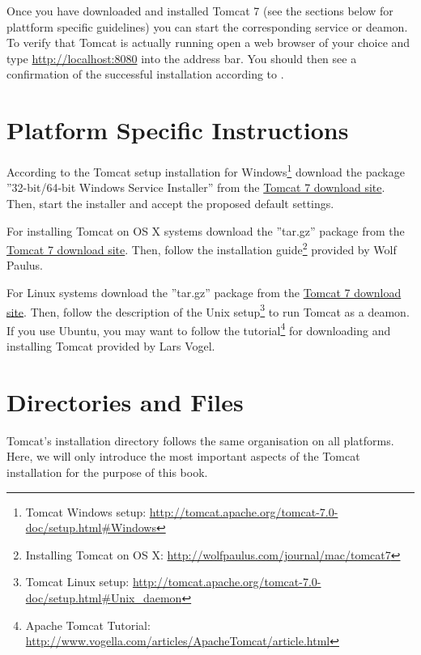 \documentclass[a4paper,10pt,twoside]{book}
\begin{document}
Once you have downloaded and installed Tomcat 7 (see the sections below for plattform specific guidelines) you can start the corresponding service or deamon.
To verify that Tomcat is actually running open a web browser of your choice and type \url{http://localhost:8080} into the address bar.
You should then see a confirmation of the successful installation according to .

\section{Platform Specific Instructions}

According to the Tomcat setup installation for Windows\footnote{
Tomcat Windows setup: \url{http://tomcat.apache.org/tomcat-7.0-doc/setup.html#Windows}
}
download the package ''32-bit/64-bit Windows Service Installer'' from the \href{http://tomcat.apache.org/download-70.cgi}{Tomcat 7 download site}.
Then, start the installer and accept the proposed default settings.

For installing Tomcat on OS X systems download the ''tar.gz'' package from the \href{http://tomcat.apache.org/download-70.cgi}{Tomcat 7 download site}.
Then, follow the installation guide\footnote{
Installing Tomcat on OS X: \url{http://wolfpaulus.com/journal/mac/tomcat7}
} provided by Wolf Paulus.

For Linux systems download the ''tar.gz'' package from the \href{http://tomcat.apache.org/download-70.cgi}{Tomcat 7 download site}.
Then, follow the description of the Unix setup\footnote{
Tomcat Linux setup: \url{http://tomcat.apache.org/tomcat-7.0-doc/setup.html#Unix_daemon}
}
to run Tomcat as a deamon.
If you use Ubuntu, you may want to follow the tutorial\footnote{
Apache Tomcat Tutorial: \url{http://www.vogella.com/articles/ApacheTomcat/article.html}
} 
for downloading and installing Tomcat provided by Lars Vogel.


\section{Directories and Files}

Tomcat's installation directory follows the same organisation on all platforms.
Here, we will only introduce the most important aspects of the Tomcat installation for the purpose of this book.
\end{document}
